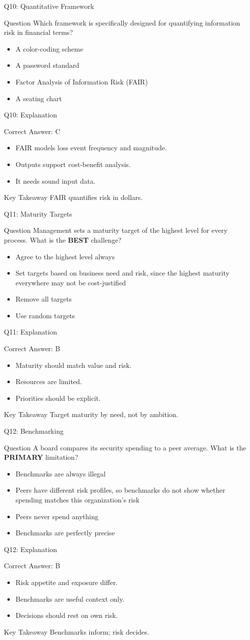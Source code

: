 \documentclass[aspectratio=169]{beamer}
\newcommand{\hq}[7]{%
	\begin{frame}{Q#1: #2}
		\begin{block}{Question}
			#3
		\end{block}
		\begin{itemize}
			#4
		\end{itemize}
	\end{frame}
	\begin{frame}{Q#1: Explanation}
		\begin{block}{Correct Answer: #5}
			\begin{itemize}
				#6
			\end{itemize}
		\end{block}
		\begin{alertblock}{Key Takeaway}
			#7
		\end{alertblock}
	\end{frame}
}
\begin{document}
	\hq{10}{Quantitative Framework}
	{Which framework is specifically designed for quantifying information risk in financial terms?}
	{\item[\textbf{(A)}] A color-coding scheme
		\item[\textbf{(B)}] A password standard
		\item[\textbf{(C)}] Factor Analysis of Information Risk (FAIR)
		\item[\textbf{(D)}] A seating chart}
	{C}
	{\item FAIR models loss event frequency and magnitude.
		\item Outputs support cost-benefit analysis.
		\item It needs sound input data.}
	{FAIR quantifies risk in dollars.}

	\hq{11}{Maturity Targets}
	{Management sets a maturity target of the highest level for every process. What is the \textbf{BEST} challenge?}
	{\item[\textbf{(A)}] Agree to the highest level always
		\item[\textbf{(B)}] Set targets based on business need and risk, since the highest maturity everywhere may not be cost-justified
		\item[\textbf{(C)}] Remove all targets
		\item[\textbf{(D)}] Use random targets}
	{B}
	{\item Maturity should match value and risk.
		\item Resources are limited.
		\item Priorities should be explicit.}
	{Target maturity by need, not by ambition.}

	\hq{12}{Benchmarking}
	{A board compares its security spending to a peer average. What is the \textbf{PRIMARY} limitation?}
	{\item[\textbf{(A)}] Benchmarks are always illegal
		\item[\textbf{(B)}] Peers have different risk profiles, so benchmarks do not show whether spending matches this organization's risk
		\item[\textbf{(C)}] Peers never spend anything
		\item[\textbf{(D)}] Benchmarks are perfectly precise}
	{B}
	{\item Risk appetite and exposure differ.
		\item Benchmarks are useful context only.
		\item Decisions should rest on own risk.}
	{Benchmarks inform; risk decides.}
\end{document}
